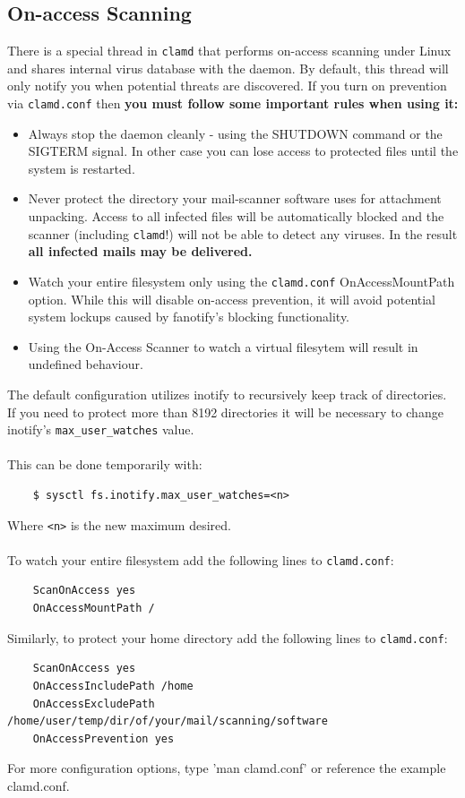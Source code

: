 \documentclass[a4paper,titlepage,12pt]{article}
\begin{document}
    \subsection{On-access Scanning}\label{On-access}
    There is a special thread in \verb+clamd+ that performs on-access
    scanning under Linux and shares internal virus database
    with the daemon. By default, this thread will only notify you when
    potential threats are discovered. If you turn on prevention via
    \verb+clamd.conf+ then \textbf{you must follow some important rules when
    using it:}
    \begin{itemize}
	\item Always stop the daemon cleanly - using the SHUTDOWN command or
	      the\\ SIGTERM signal. In other case you can lose access
	      to protected files until the system is restarted.
	\item Never protect the directory your mail-scanner software
	      uses for attachment unpacking. Access to all infected
	      files will be automatically blocked and the scanner (including
	      \verb+clamd+!) will not be able to detect any viruses. In the
	      result \textbf{all infected mails may be delivered.}
	\item Watch your entire filesystem only using the \verb+clamd.conf+
	      OnAccessMountPath option. While this will disable on-access prevention,
	      it will avoid potential system lockups caused by fanotify's blocking
	      functionality.
	\item Using the On-Access Scanner to watch a virtual filesytem will result
	      in undefined behaviour.
    \end{itemize}
    The default configuration utilizes inotify to recursively keep track of
    directories. If you need to protect more than 8192 directories it will
    be necessary to change inotify's \verb+max_user_watches+ value.
    \\\\
    This can be done temporarily with:
    \begin{verbatim}
    $ sysctl fs.inotify.max_user_watches=<n>
    \end{verbatim}
    Where \verb+<n>+ is the new maximum desired.
    \\\\
    To watch your entire filesystem add the following lines to
    \verb+clamd.conf+:
    \begin{verbatim}
	ScanOnAccess yes
	OnAccessMountPath /
    \end{verbatim}
    Similarly, to protect your home directory add the following lines to
    \verb+clamd.conf+:
    \begin{verbatim}
	ScanOnAccess yes
	OnAccessIncludePath /home
	OnAccessExcludePath /home/user/temp/dir/of/your/mail/scanning/software
	OnAccessPrevention yes
    \end{verbatim}
    For more configuration options, type 'man clamd.conf' or reference the
    example clamd.conf.
\end{document}
